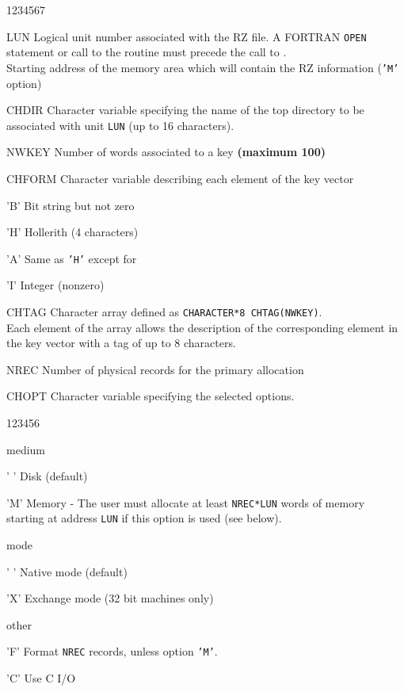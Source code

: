 \begin{DLtt}{1234567}
\item[LUN]Logical unit number associated with the RZ file.
A FORTRAN {\tt OPEN} statement or call to the
routine  must precede the call to .\\
Starting address of the memory area which will contain the
RZ information ({\tt'M'} option)
\item[CHDIR]Character variable specifying the name of the top directory to be
associated with unit {\tt LUN} (up to 16 characters).
\item[NWKEY] Number of words associated to a key {\bf (maximum 100)}
\item[CHFORM] Character variable describing each element of the key vector
\begin{DLtt}{12}
\item['B']Bit string but not zero
\item['H']Hollerith (4 characters)
\item['A']Same as {\tt'H'} except for 
\item['I']Integer (nonzero)
\end{DLtt}
\item[CHTAG]Character array defined as {\tt CHARACTER*8 CHTAG(NWKEY)}.\\
Each element of the array allows the description of the corresponding
element in the key vector with a tag of up to 8 characters.
\item[NREC]Number of physical records for the primary allocation
\item[CHOPT]Character variable specifying the selected options.
\begin{DLtt}{123456}
\item[{\rm medium}]
\begin{DLtt}{12}
\item[' ']Disk (default)
\item['M']Memory - The user must allocate at least {\tt NREC*LUN} words
of memory starting at address {\tt LUN} if this option is used
(see below).
\end{DLtt}
\item[{\rm mode}]
\begin{DLtt}{12}
\item[' ']Native mode (default)
\item['X']Exchange mode (32 bit machines only)
\end{DLtt}
\item[{\rm other}]
\begin{DLtt}{12}
\item['F']Format {\tt NREC} records, unless option {\tt'M'}.
\item['C']Use C I/O
\end{DLtt}
\end{DLtt}
\end{DLtt}

